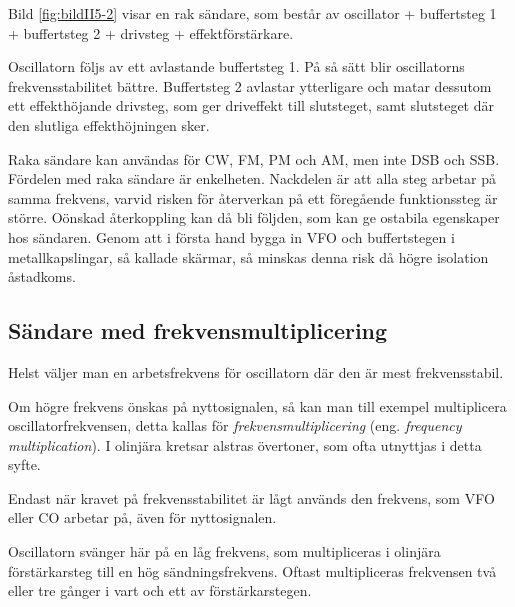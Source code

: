 
Bild \ref{fig:bildII5-2} visar en rak sändare, som består av oscillator +
buffertsteg 1 + buffertsteg 2 + drivsteg + effektförstärkare.

Oscillatorn följs av ett avlastande buffertsteg 1.
På så sätt blir oscillatorns frekvensstabilitet bättre.
Buffertsteg 2 avlastar ytterligare och matar dessutom ett effekthöjande
drivsteg, som ger driveffekt till slutsteget, samt slutsteget där den slutliga
effekthöjningen sker.

Raka sändare kan användas för CW, FM, PM och AM, men inte DSB och SSB.
Fördelen med raka sändare är enkelheten.
Nackdelen är att alla steg arbetar på samma frekvens, varvid risken för
återverkan på ett föregående funktionssteg är större.
Oönskad återkoppling kan då bli följden, som kan ge ostabila egenskaper hos
sändaren.
Genom att i första hand bygga in VFO och buffertstegen i metallkapslingar,
så kallade skärmar, så minskas denna risk då högre isolation åstadkoms.

\subsection{Sändare med frekvensmultiplicering}

Helst väljer man en arbetsfrekvens för oscillatorn där den är mest
frekvensstabil.

Om högre frekvens önskas på nyttosignalen, så kan man
till exempel multiplicera oscillatorfrekvensen, detta kallas för
\emph{frekvensmultiplicering} (eng. \emph{frequency multiplication}).
I olinjära kretsar alstras övertoner, som ofta utnyttjas i detta syfte.

Endast när kravet på frekvensstabilitet är lågt används den frekvens,
som VFO eller CO arbetar på, även för nyttosignalen.


Oscillatorn svänger här på en låg frekvens, som multipliceras i
olinjära förstärkarsteg till en hög sändningsfrekvens.
Oftast multipliceras frekvensen två eller tre gånger i vart och ett av
förstärkarstegen.


